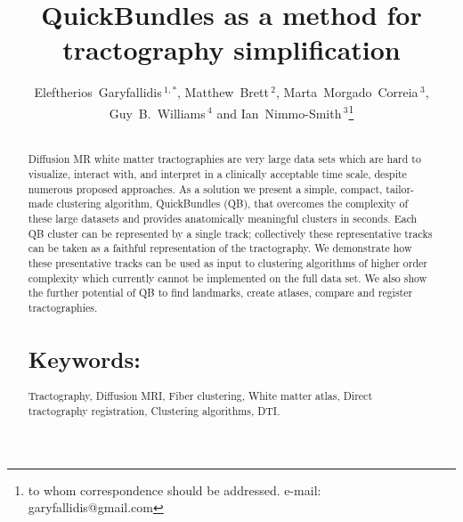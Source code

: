 \documentclass{bioinfo}
\begin{document}

\title[QuickBundles]{QuickBundles as a method for tractography simplification}


\author[Garyfallidis, Brett, Corriea, Williams and
Nimmo-Smith]{Eleftherios~Garyfallidis\,$^{1,*}$, Matthew~Brett\,$^{2}$,
  Marta~Morgado~Correia\,$^{3}$, Guy~B.~Williams\,$^{4}$ and
  Ian~Nimmo-Smith\,$^{3}$\footnote{to whom correspondence should be
    addressed. e-mail: garyfallidis@gmail.com}}

\address{\,$^{1}$University of Cambridge, Cambridge, UK\\
  \,$^{2}$University of California, Henry H. Wheeler, Jr. Brain Imaging Center, Berkeley, CA.\\
  \,$^{3}$MRC Cognition and Brain Sciences Unit, Cambridge, UK.\\
  \,$^{4}$Wolfson Brain Imaging Centre, University of Cambridge,
  Cambridge, UK.}


\history{}

\editor{}

\maketitle

\begin{abstract}

\section{}
Diffusion MR white matter tractographies are very large data sets which
are hard to visualize, interact with, and interpret in a clinically
acceptable time scale, despite numerous proposed approaches. As a
solution we present a simple, compact, tailor-made clustering algorithm,
QuickBundles (QB), that overcomes the complexity of these large datasets
and provides anatomically meaningful clusters in seconds. Each QB
cluster can be represented by a single track; collectively these
representative tracks can be taken as a faithful representation of the
tractography. We demonstrate how these presentative tracks can be used
as input to clustering algorithms of higher order complexity which
currently cannot be implemented on the full data set. We also show the
further potential of QB to find landmarks, create atlases, compare and
register tractographies.


\section{Keywords:} Tractography, Diffusion MRI, Fiber clustering, White
matter atlas, Direct tractography registration, Clustering algorithms,
DTI.

\end{abstract}
\end{document}
